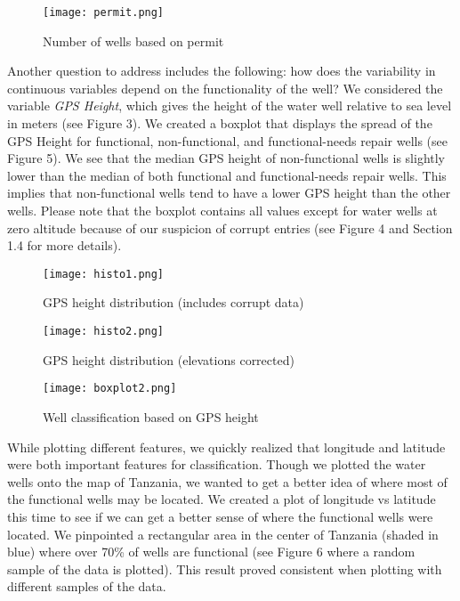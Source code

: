 \documentclass[10pt]{SelfArx} %
\begin{document}
\begin{figure}[ht]\centering
\captionsetup{skip=0.5cm}
\texttt{[image: permit.png]}
\caption{Number of wells based on permit}
\label{fig:permit}
\end{figure}

Another question to address includes the following: how does the variability in continuous variables depend on the functionality of the well? We considered the variable \textit{GPS Height}, which gives the height of the water well relative to sea level in meters (see Figure 3). We created a boxplot that displays the spread of the GPS Height for functional, non-functional, and functional-needs repair wells (see Figure 5). We see that the median GPS height of non-functional wells is slightly lower than the median of both functional and functional-needs repair wells. This implies that non-functional wells tend to have a lower GPS height than the other wells. Please note that the boxplot contains all values except for water wells at zero altitude because of our suspicion of corrupt entries (see Figure 4 and Section 1.4 for more details).
\break

\begin{figure}[ht]\centering
\captionsetup{skip=0.5cm}
\texttt{[image: histo1.png]}
\caption{GPS height distribution (includes corrupt data)}
\label{fig:hitso1}
\end{figure}

\begin{figure}[ht]\centering
\captionsetup{skip=0.5cm}
\texttt{[image: histo2.png]}
\caption{GPS height distribution (elevations corrected)}
\label{fig:hitso2}
\end{figure}

\begin{figure}[ht]\centering
\captionsetup{skip=0.5cm}
\texttt{[image: boxplot2.png]}
\caption{Well classification based on GPS height}
\label{fig:GPS}
\end{figure}

While plotting different features, we quickly realized that longitude and latitude were both important features for classification. Though we plotted the water wells onto the map of Tanzania, we wanted to get a better idea of where most of the functional wells may be located. We created a plot of longitude vs latitude this time to see if we can get a better sense of where the functional wells were located. We pinpointed a rectangular area  in the center of Tanzania (shaded in blue) where over 70\% of wells are functional (see Figure 6 where a random sample of the data is plotted). This result proved consistent when plotting with different samples of the data.
\break
\end{document}
